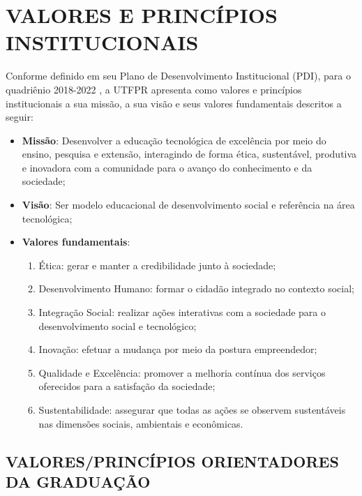 \chapter{VALORES E PRINCÍPIOS INSTITUCIONAIS}

Conforme definido em seu Plano de Desenvolvimento Institucional (PDI), para o quadriênio 2018-2022 \cite{pdiutfpr}, a UTFPR apresenta como valores e princípios institucionais a sua missão, a sua visão e seus valores fundamentais descritos a seguir:


\begin{itemize}[label={}]
	\item \textbf{Missão}: Desenvolver a educação tecnológica de excelência por meio do ensino, pesquisa e extensão, interagindo de forma ética, sustentável, produtiva e inovadora com a comunidade para o avanço do conhecimento e da sociedade;
	
	\item \textbf{Visão}: Ser modelo educacional de desenvolvimento social e referência na área tecnológica;
	
	\item \textbf{Valores fundamentais}:
	
	\begin{enumerate}
		\item Ética: gerar e manter a credibilidade junto à sociedade;
		
		\item Desenvolvimento Humano: formar o cidadão integrado no contexto social;
		\item Integração Social: realizar ações interativas com a sociedade para o desenvolvimento social e tecnológico;
		\item Inovação: efetuar a mudança por meio da postura empreendedor;
		\item Qualidade e Excelência: promover a melhoria contínua dos serviços oferecidos para a satisfação da sociedade;
		\item Sustentabilidade: assegurar que todas as ações se observem sustentáveis nas dimensões sociais, ambientais e econômicas.
		
	\end{enumerate}

\end{itemize}

\section{VALORES/PRINCÍPIOS ORIENTADORES DA GRADUAÇÃO}

